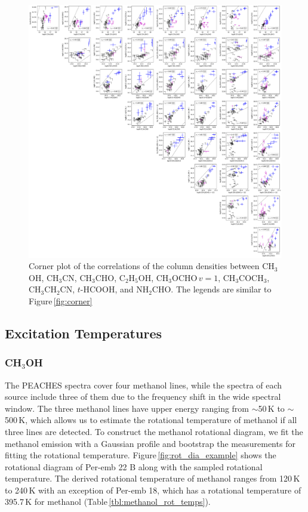 \documentclass[twocolumn]{aastex62}
\newcommand{\methylformatev}{\mbox{CH$_{3}$OCHO\,$v=1$}}
\newcommand{\methanol}{\mbox{CH$_{3}$OH}}
\newcommand{\acetone}{\mbox{CH$_{3}$COCH$_{3}$}}
\newcommand{\ethanol}{\mbox{C$_{2}$H$_{5}$OH}}
\newcommand{\acetaldehyde}{\mbox{CH$_{3}$CHO}}
\newcommand{\ethylcyanide}{\mbox{CH$_{3}$CH$_{2}$CN}}
\newcommand{\methylcyanide}{\mbox{CH$_{3}$CN}}
\newcommand{\formamide}{\mbox{NH$_{2}$CHO}}
\begin{document}
\begin{figure}[htbp!]
  \centering
  \includegraphics[width=\textwidth]{corner_Ncol_correlations_minor.pdf}
  \caption{Corner plot of the correlations of the column densities between \methanol, \methylcyanide, \acetaldehyde, \ethanol, \methylformatev, \acetone, \ethylcyanide, $t$-HCOOH, and \formamide.  The legends are similar to Figure\,\ref{fig:corner}}
  \label{fig:corner_minor}
\end{figure}

\subsection{Excitation Temperatures}
\subsubsection{\methanol}
The PEACHES spectra cover four methanol lines, while the spectra of each source include three of them due to the frequency shift in the wide spectral window.  The three methanol lines have upper energy ranging from $\sim$50\,K to $\sim$500\,K, which allows us to estimate the rotational temperature of methanol if all three lines are detected.  To construct the methanol rotational diagram, we fit the methanol emission with a Gaussian profile and bootstrap the measurements for fitting the rotational temperature.  Figure\,\ref{fig:rot_dia_example} shows the rotational diagram of Per-emb 22 B along with the sampled rotational temperature.  The derived rotational temperature of methanol ranges from 120\,K to 240\,K with an exception of Per-emb 18, which has a rotational temperature of 395.7\,K for methanol (Table\,\ref{tbl:methanol_rot_temps}).
\end{document}

